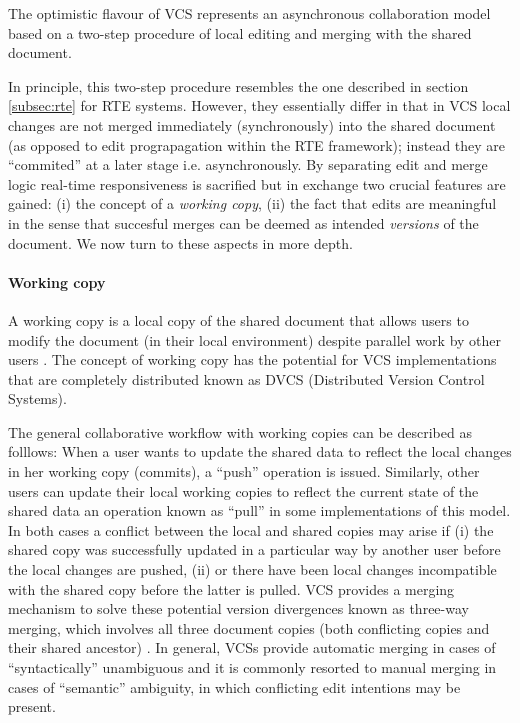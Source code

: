 \documentclass{sig-alternate}
\begin{document}
The optimistic flavour of VCS represents an asynchronous collaboration model based on a
two-step procedure of local editing and merging with the shared document.

In principle, this two-step procedure resembles the one described in section \ref{subsec:rte}
for RTE systems. However, they essentially differ in that in VCS local changes are not merged
immediately (synchronously) into the shared document (as opposed to edit prograpagation
within the RTE framework); instead they are ``commited'' at a later stage
\textemdash i.e. asynchronously.
By separating edit and merge logic real-time responsiveness is
sacrified but in exchange two crucial features are gained: (i) the concept of a
\textit{working copy}, (ii) the fact that edits are meaningful \textemdash in the sense
that succesful merges can be deemed as intended \textit{versions} of the document.
We now turn to these aspects in more depth.

\paragraph*{Working copy}
A working copy is a local copy of the shared document that allows users
to modify the document (in their local environment) despite parallel work by other users
\cite{Collins-Sussman}. The concept of working copy has the potential for VCS implementations
that are completely distributed \textemdash known as DVCS (Distributed Version Control Systems). %

The general collaborative workflow with working copies can be described as folllows:
When a user wants to update the shared data to reflect the local changes in her working copy
(commits), a ``push'' operation is issued. Similarly, other users can update their local
working copies to reflect the current state of the shared data \textemdash an operation
known as ``pull'' in some implementations of this model.
In both cases a conflict between the local and shared copies may arise if (i) the shared
copy was successfully updated in a particular way by another user before the local changes
are pushed, (ii) or there have been local changes incompatible with the shared copy before
the latter is pulled.
VCS provides a merging mechanism to solve these potential version divergences known as
three-way merging, which involves all three document copies (both conflicting copies and their
shared ancestor) \cite{Altmanninger2009}. In general, VCSs provide automatic merging in cases
of ``syntactically'' unambiguous and it is commonly resorted to manual merging in cases
of ``semantic'' ambiguity, in which conflicting edit intentions may be present.%
\end{document}
